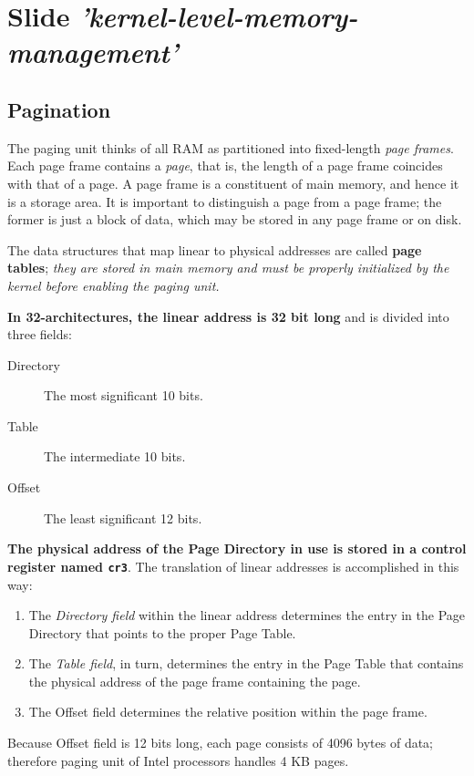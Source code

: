 \documentclass[10pt,a4paper]{article}
\begin{document}
\newpage
\section{Slide \textit{'kernel-level-memory-management'}}




\subsection{Pagination}

The paging unit thinks of all RAM as partitioned into fixed-length \textit{page frames}. Each page frame contains a \textit{page}, that is, the length of a page frame coincides with that of a page. A page frame is a constituent of main memory, and hence it is a storage area. 
It is important to distinguish a page from a page frame; the former is just a block of data, which may be stored in any page frame or on disk.

The data structures that map linear to physical addresses are called \textbf{page tables}; \textit{ they are stored in main memory and must be properly initialized by the kernel before enabling the paging unit.}

\textbf{In 32-architectures, the linear address is 32 bit long} and is divided into three fields:
\begin{description}
\item[Directory] The most significant 10 bits.
\item[Table] The intermediate 10 bits.
\item[Offset] The least significant 12 bits.
\end{description}

\textbf{The physical address of the Page Directory in use is stored in a control register named \texttt{cr3}}. The translation of linear addresses is accomplished in this way:
\begin{enumerate}
\item The \textit{Directory field} within the linear address determines the entry in the Page Directory that points to the proper Page Table.
\item The \textit{Table field}, in turn, determines the entry in the Page Table that contains the physical address of the page frame containing the page.
\item The Offset field determines the relative position within the page frame. 
\end{enumerate}

Because Offset field is 12 bits long, each page consists of 4096 bytes of data; therefore paging unit of Intel processors handles 4 KB pages.
\end{document}
